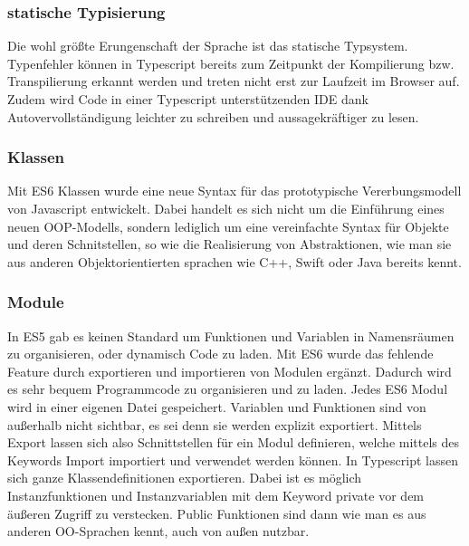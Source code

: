 \subsubsection{statische Typisierung}

Die wohl größte Erungenschaft der Sprache ist das statische Typsystem.
Typenfehler können in Typescript bereits zum Zeitpunkt
der Kompilierung bzw. Transpilierung erkannt werden und treten nicht erst zur Laufzeit im Browser auf.
Zudem wird Code in einer Typescript unterstützenden IDE dank Autovervollständigung
leichter zu schreiben und aussagekräftiger zu lesen.\cite[156]{ng-Book-2}

\subsubsection{Klassen}

Mit ES6 Klassen wurde eine neue Syntax für das prototypische Vererbungsmodell von Javascript entwickelt.
Dabei handelt es sich nicht um die Einführung eines neuen OOP-Modells, sondern lediglich um eine vereinfachte Syntax für Objekte und deren Schnitstellen,
so wie die Realisierung von Abstraktionen, wie man sie aus anderen Objektorientierten sprachen wie C++, Swift oder Java bereits kennt.\cite{js-Klassen}



\subsubsection{Module}

In ES5 gab es keinen Standard um Funktionen und Variablen in Namensräumen zu organisieren, oder dynamisch Code zu laden.
Mit ES6 wurde das fehlende Feature durch exportieren und importieren von Modulen ergänzt. Dadurch wird es sehr bequem Programmcode zu organisieren und zu laden.
Jedes ES6 Modul wird in einer eigenen Datei gespeichert. Variablen und Funktionen sind von außerhalb nicht sichtbar, es sei denn sie werden explizit exportiert.
Mittels Export lassen sich also Schnittstellen für ein Modul definieren, welche mittels des Keywords Import importiert und verwendet werden können.
In Typescript lassen sich ganze Klassendefinitionen exportieren.
Dabei ist es möglich Instanzfunktionen und Instanzvariablen mit dem Keyword private vor dem äußeren Zugriff zu verstecken.
Public Funktionen sind dann wie man es aus anderen OO-Sprachen kennt, auch von außen nutzbar.

